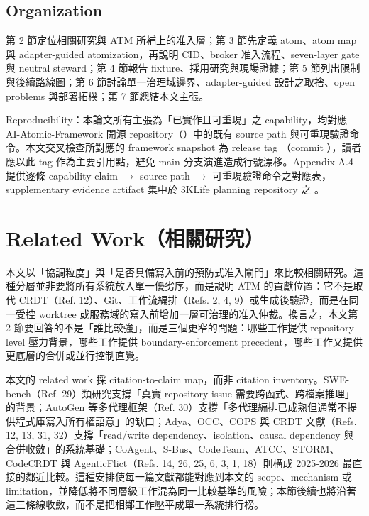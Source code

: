 \documentclass[a4paper,fontset=none]{ctexart}
\begin{document}
\subsection{Organization}

第 2 節定位相關研究與 ATM 所補上的准入層；第 3 節先定義 atom、atom map 與 adapter-guided atomization，再說明 CID、broker 准入流程、seven-layer gate 與 neutral steward；第 4 節報告 fixture、採用研究與現場證據；第 5 節列出限制與後續路線圖；第 6 節討論單一治理域邊界、adapter-guided 設計之取捨、open problems 與部署拓樸；第 7 節總結本文主張。

Reproducibility：本論文所有主張為「已實作且可重現」之 capability，均對應 AI-Atomic-Framework 開源 repository（\texttt{}）中的既有 source path 與可重現驗證命令。本文交叉檢查所對應的 framework snapshot 為 release tag \texttt{}（commit \texttt{}），讀者應以此 tag 作為主要引用點，避免 main 分支演進造成行號漂移。Appendix A.4 提供逐條 capability claim $\rightarrow$ source path $\rightarrow$ 可重現驗證命令之對應表，supplementary evidence artifact 集中於 3KLife planning repository 之 \texttt{}。

\medskip

\section{Related Work（相關研究）}

本文以「協調粒度」與「是否具備寫入前的預防式准入閘門」來比較相關研究。這種分層並非要將所有系統放入單一優劣序，而是說明 ATM 的貢獻位置：它不是取代 CRDT（Ref. 12）、Git、工作流編排（Refs. 2, 4, 9）或生成後驗證，而是在同一受控 worktree 或服務域的寫入前增加一層可治理的准入仲裁。換言之，本文第 2 節要回答的不是「誰比較強」，而是三個更窄的問題：哪些工作提供 repository-level 壓力背景，哪些工作提供 boundary-enforcement precedent，哪些工作又提供更底層的合併或並行控制直覺。

本文的 related work 採 citation-to-claim map，而非 citation inventory。SWE-bench（Ref. 29）類研究支撐「真實 repository issue 需要跨函式、跨檔案推理」的背景；AutoGen 等多代理框架（Ref. 30）支撐「多代理編排已成熟但通常不提供程式庫寫入所有權語意」的缺口；Adya、OCC、COPS 與 CRDT 文獻（Refs. 12, 13, 31, 32）支撐「read/write dependency、isolation、causal dependency 與合併收斂」的系統基礎；CoAgent、S-Bus、CodeTeam、ATCC、STORM、CodeCRDT 與 AgenticFlict（Refs. 14, 26, 25, 6, 3, 1, 18）則構成 2025-2026 最直接的鄰近比較。這種安排使每一篇文獻都能對應到本文的 scope、mechanism 或 limitation，並降低將不同層級工作混為同一比較基準的風險；本節後續也將沿著這三條線收斂，而不是把相鄰工作壓平成單一系統排行榜。
\end{document}
